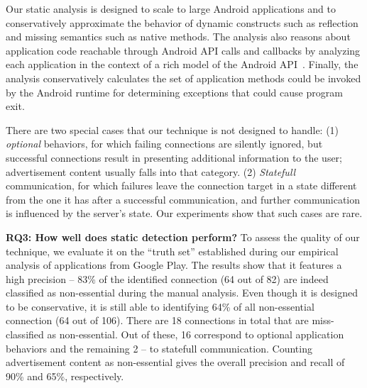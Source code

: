 Our static analysis is designed to scale to large Android applications
and to conservatively approximate the behavior of dynamic constructs
such as reflection and missing semantics such as native methods.  The
analysis also reasons about application code reachable through Android
API calls and callbacks by analyzing each application in the context
of a rich model of the Android
API~\cite{Gordon:Kim:Perkins:Gilham:Nguyen:Rinard:NDSS15}.  Finally,
the analysis conservatively calculates the set of application methods
could be invoked by the Android runtime for determining exceptions
that could cause program exit.


There are two special cases that our technique is not designed to handle: (1) \emph{optional} behaviors, for which failing connections are silently ignored, but successful connections result in presenting additional information to the user; 
advertisement content usually falls into that category. (2) \emph{Statefull} communication, for which failures leave the 
connection target in a state different from the one it has after a successful communication, and further communication is influenced by the server's state. Our experiments show that such cases are rare. 

%
 



\vspace{0.1in}
\noindent 
{\bf RQ3: How well does static detection perform?}
To assess the quality of our technique, we evaluate it on the ``truth set'' established during our empirical analysis of applications from Google Play.
The results show that it features a high precision -- 83\% of the identified connection (64 out of 82) are indeed classified as non-essential during the manual analysis. Even though it is designed to be conservative, it is still able to identifying  64\% of all non-essential connection (64 out of 106).
There are 18 connections in total that are miss-classified as non-essential. Out of these, 16 correspond to optional application behaviors and the remaining 2 -- to statefull communication. Counting advertisement content as non-essential
gives the overall precision and recall of 90\% and 65\%, respectively.  

